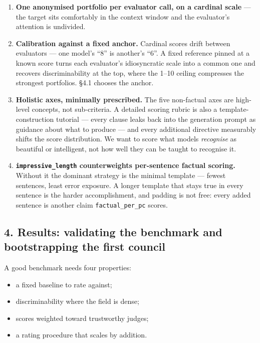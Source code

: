 \begin{enumerate}
\def\labelenumi{(\roman{enumi})}
\item
  \textbf{One anonymised portfolio per evaluator call, on a cardinal scale} --- the target sits comfortably in the context window and the evaluator's attention is undivided.
\item
  \textbf{Calibration against a fixed anchor.} Cardinal scores drift between evaluators --- one model's ``8'' is another's ``6''. A fixed reference pinned at a known score turns each evaluator's idiosyncratic scale into a common one and recovers discriminability at the top, where the 1--10 ceiling compresses the strongest portfolios. §4.1 chooses the anchor.
\item
  \textbf{Holistic axes, minimally prescribed.} The five non-factual axes are high-level concepts, not sub-criteria. A detailed scoring rubric is also a template-construction tutorial --- every clause leaks back into the generation prompt as guidance about what to produce --- and every additional directive measurably shifts the score distribution. We want to score what models \emph{recognise} as beautiful or intelligent, not how well they can be taught to recognise it.
\item
  \textbf{\texttt{impressive\_length} counterweights per-sentence factual scoring.} Without it the dominant strategy is the minimal template --- fewest sentences, least error exposure. A longer template that stays true in every sentence is the harder accomplishment, and padding is not free: every added sentence is another claim \texttt{factual\_per\_pc} scores.
\end{enumerate}

\subsection{4. Results: validating the benchmark and bootstrapping the first council}\label{results-validating-the-benchmark-and-bootstrapping-the-first-council}

A good benchmark needs four properties:

\begin{itemize}
\tightlist
\item
  a fixed baseline to rate against;
\item
  discriminability where the field is dense;
\item
  scores weighted toward trustworthy judges;
\item
  a rating procedure that scales by addition.
\end{itemize}

